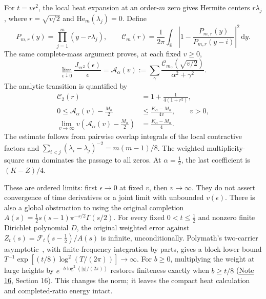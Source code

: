\documentclass[11pt]{article}
\newcommand{\dd}{\,\mathrm d}
\newcommand{\Nref}{\href{../notes/16_GEVREY_GLOBAL_APPROXIMATION_AND_RATE_20261020.md}{Note 16}}
\begin{document}
For \(t=v\epsilon^2\), the local heat expansion at an order-\(m\)
zero gives Hermite centers \(r\lambda_j\), where
\(r=\sqrt{v/2}\) and \(\mathrm{He}_m(\lambda_j)=0\).
Define
\[
 P_{m,r}(y)=\prod_{j=1}^m(y-r\lambda_j),\qquad
 \mathcal C_m(r)=\frac1{2\pi}\int_{\mathbb R}
 \left|1-\frac{P_{m,r}(y)}{P_{m,r}(y-i)}\right|^2\dd y.
\]
The same complete-mass argument proves, at each fixed \(v\ge0\),
\[
 \lim_{\epsilon\downarrow0}\frac{J_{v\epsilon^2}(\epsilon)}{\epsilon}
   =\mathcal A_\alpha(v)
   :=\sum_\gamma
      \frac{\mathcal C_{m_\gamma}(\sqrt{v/2})}{\alpha^2+\gamma^2}.
\]
The analytic transition is quantified by
\begin{align}
 \mathcal C_2(r)&=1+\frac1{4(1+r^2)},\label{eq:double}\\
 0\le \mathcal A_\alpha(v)-\frac{M_\alpha}{2}
     &\le\frac{K_\alpha-M_\alpha}{4v},\qquad v>0,\label{eq:heatbound}\\
 \lim_{v\to\infty}v\left(\mathcal A_\alpha(v)-\frac{M_\alpha}{2}\right)
     &=\frac{K_\alpha-M_\alpha}{4}.\label{eq:heatlimit}
\end{align}
The estimate follows from pairwise overlap integrals of the local
contractive factors and
\(\sum_{i<j}(\lambda_i-\lambda_j)^{-2}=m(m-1)/8\).
The weighted multiplicity-square sum dominates the passage to all
zeros. At \(\alpha=\frac12\), the last coefficient is \((K-Z)/4\).

These are ordered limits: first \(\epsilon\to0\) at fixed \(v\), then
\(v\to\infty\). They do not assert convergence of time derivatives
or a joint limit with unbounded \(v(\epsilon)\).
There is also a global obstruction to using the original completion
\(A(s)=\tfrac12s(s-1)\pi^{-s/2}\Gamma(s/2)\).
For every fixed \(0<t\le\frac12\) and nonzero finite Dirichlet polynomial
\(D\), the original weighted error against
\(Z_t(s)=\mathcal F_t(s-\frac12)/A(s)\) is infinite, unconditionally.
Polymath's two-carrier asymptotic~\cite{Polymath}, with finite-frequency
integration by parts, gives a block lower bound
\(T^{-1}\exp[(t/8)\log^2(T/(2\pi))]\to\infty\).
For \(b\ge0\), multiplying the weight at large heights by
\(e^{-b\log^2(|y|/(2\pi))}\) restores finiteness exactly when
\(b\ge t/8\) (\Nref, Section 16). This changes the norm; it leaves
the compact heat calculation and completed-ratio energy intact.
\end{document}
